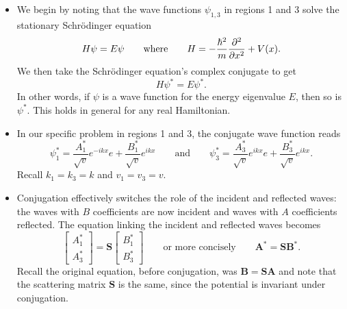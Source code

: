 \documentclass[11pt, a4paper]{article}
\newcommand{\eqtext}[1]{\qquad \text{#1} \qquad}
\newcommand{\Schro}{Schr\"{o}dinger\xspace}
\renewcommand{\vec}[1]{\bm{#1}} %
\newcommand{\mat}[1]{\mathbf{#1}} %
\begin{document}
\begin{itemize}
	\item  We begin by noting that the wave functions $ \psi_{1,3} $ in regions 1 and 3 solve the stationary \Schro equation
	\begin{equation*}
		H \psi = E \psi \eqtext{where} H = -\frac{\hbar^{2}}{m}\pdv[2]{}{x} + V(x).
	\end{equation*}
	We then take the \Schro equation's complex conjugate to get
	\begin{equation*}
		H \psi^{*} = E\psi^{*}.
	\end{equation*}
	In other words, if $ \psi $ is a wave function for the energy eigenvalue $ E $, then so is $ \psi^{*} $. This holds in general for any real Hamiltonian. 
	
	\item In our specific problem in regions 1 and 3, the conjugate wave function reads
	\begin{equation*}
		\psi_{1}^{*} = \frac{A_{1}^{*}}{\sqrt{v}}e^{-ikx} e + \frac{B_{1}^{*}}{\sqrt{v}}e^{ikx} \eqtext{and} \psi_{3}^{*} = \frac{A_{3}^{*}}{\sqrt{v}}e^{ikx} e + \frac{B_{3}^{*}}{\sqrt{v}}e^{ikx}.
	\end{equation*}
	Recall $ k_{1} = k_{3} = k $ and $ v_{1} = v_{3} = v $.
	
	\item Conjugation effectively switches the role of the incident and reflected waves: the waves with $ B $ coefficients are now incident and waves with $ A $ coefficients reflected. The equation linking the incident and reflected waves becomes
	\begin{equation*}
		\begin{bmatrix}
			A_{1}^{*}\\
			A_{3}^{*} 
		\end{bmatrix}
		= 
		\mat{S}
		\begin{bmatrix}
			B_{1}^{*}\\
			B_{3}^{*}
		\end{bmatrix}
		\eqtext{or more concisely} \vec{A}^{*} = \mat{S} \vec{B}^{*}.
	\end{equation*}
	Recall the original equation, before conjugation, was $ \vec{B} = \mat{S} \vec{A} $ and note that the scattering matrix $ \mat{S} $ is the same, since the potential is invariant under conjugation.
	

\end{itemize}
\end{document}
